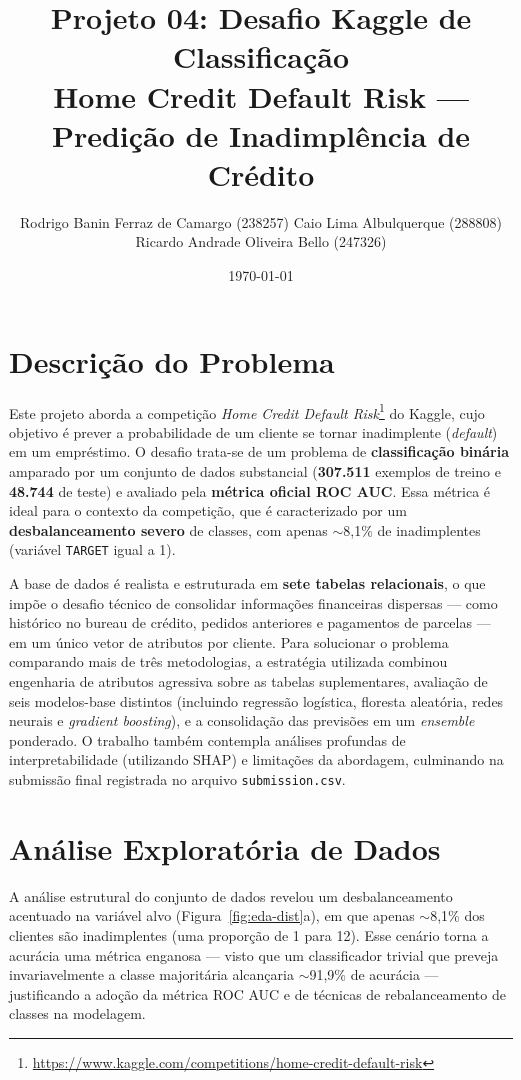 \documentclass[10pt,a4paper]{article}
\title{Projeto 04: Desafio Kaggle de Classificação\\ \large Home Credit Default Risk --- Predição de Inadimplência de Crédito}
\author{
  \small
  Rodrigo Banin Ferraz de Camargo (238257)
  \textbullet{}
    Caio Lima Albulquerque (288808) \\ \small Ricardo Andrade Oliveira Bello (247326)
  \date{\small\today}
}
\begin{document}
\maketitle

\section{Descrição do Problema}
Este projeto aborda a competição \textit{Home Credit Default Risk}\footnote{\url{https://www.kaggle.com/competitions/home-credit-default-risk}} do Kaggle, cujo objetivo é prever a probabilidade de um cliente se tornar inadimplente (\textit{default}) em um empréstimo. O desafio trata-se de um problema de \textbf{classificação binária} amparado por um conjunto de dados substancial (\textbf{307.511} exemplos de treino e \textbf{48.744} de teste) e avaliado pela \textbf{métrica oficial ROC AUC}. Essa métrica é ideal para o contexto da competição, que é caracterizado por um \textbf{desbalanceamento severo} de classes, com apenas $\sim$8,1\% de inadimplentes (variável \texttt{TARGET} igual a 1).

A base de dados é realista e estruturada em \textbf{sete tabelas relacionais}, o que impõe o desafio técnico de consolidar informações financeiras dispersas --- como histórico no bureau de crédito, pedidos anteriores e pagamentos de parcelas --- em um único vetor de atributos por cliente. Para solucionar o problema comparando mais de três metodologias, a estratégia utilizada combinou engenharia de atributos agressiva sobre as tabelas suplementares, avaliação de seis modelos-base distintos (incluindo regressão logística, floresta aleatória, redes neurais e \textit{gradient boosting}), e a consolidação das previsões em um \textit{ensemble} ponderado. O trabalho também contempla análises profundas de interpretabilidade (utilizando SHAP) e limitações da abordagem, culminando na submissão final registrada no arquivo \texttt{submission.csv}.

\section{Análise Exploratória de Dados}
A análise estrutural do conjunto de dados revelou um desbalanceamento acentuado na variável alvo (Figura~\ref{fig:eda-dist}a), em que apenas $\sim$8,1\% dos clientes são inadimplentes (uma proporção de 1 para 12). Esse cenário torna a acurácia uma métrica enganosa --- visto que um classificador trivial que preveja invariavelmente a classe majoritária alcançaria $\sim$91,9\% de acurácia --- justificando a adoção da métrica ROC AUC e de técnicas de rebalanceamento de classes na modelagem.
\end{document}
